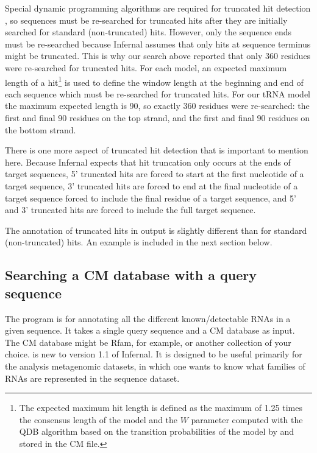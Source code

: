 Special dynamic programming algorithms are required for truncated hit
detection \cite{KolbeEddy09}, so sequences must be re-searched for
truncated hits after they are initially searched for standard
(non-truncated) hits. However, only the sequence ends must be
re-searched because Infernal assumes that only hits at sequence
terminus might be truncated. This is why our search above reported
that only 360 residues were re-searched for truncated hits. For each
model, an expected maximum length of a hit\footnote{The expected
  maximum hit length is defined as the maximum of 1.25 times the
  consensus length of the model and the $W$ parameter computed with
  the QDB algorithm \cite{NawrockiEddy07} based on the transition
  probabilities of the model by  and stored in the CM
  file.}  is used to define the window length at the beginning and end
of each sequence which must be re-searched for truncated hits. For our
tRNA model the maximum expected length is 90, so exactly 360 residues
were re-searched: the first and final 90 residues on the top strand,
and the first and final 90 residues on the bottom strand.

There is one more aspect of truncated hit detection that is important
to mention here. Because Infernal expects that hit truncation only occurs
at the ends of target sequences, 5' truncated hits are forced to
start at the first nucleotide of a target sequence, 3' truncated hits are
forced to end at the final nucleotide of a target sequence forced to
include the final residue of a target sequence, and 5' and 3'
truncated hits are forced to include the full target sequence.

The annotation of truncated hits in  output is slightly
different than for standard (non-truncated) hits. An example is
included in the next section below.

\subsection{Searching a CM database with a query sequence}

The  program is for annotating all the different
known/detectable RNAs in a given sequence. It takes a single query
sequence and a CM database as input. The CM database might be Rfam,
for example, or another collection of your choice.  is
new to version 1.1 of Infernal. It is designed to be useful primarily
for the analysis metagenomic datasets, in which one wants to know what
families of RNAs are represented in the sequence dataset.

